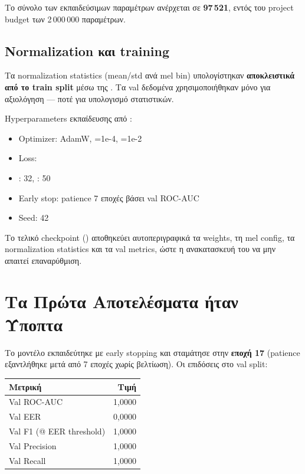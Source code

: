 Το σύνολο των εκπαιδεύσιμων παραμέτρων ανέρχεται σε \textbf{97\,521},
εντός του project budget των 2\,000\,000 παραμέτρων.

\subsection{Normalization και training}
\label{subsec:mel-training}

Τα normalization statistics (mean/std ανά mel bin) υπολογίστηκαν
\textbf{αποκλειστικά από το train split} μέσω της .
Τα val δεδομένα χρησιμοποιήθηκαν μόνο για αξιολόγηση — ποτέ για
υπολογισμό στατιστικών.

Hyperparameters εκπαίδευσης από :
\begin{itemize}
  \item Optimizer: AdamW, =1e-4, =1e-2
  \item Loss: 
  \item {}: 32, : 50
  \item Early stop: patience 7 εποχές βάσει val ROC-AUC
  \item Seed: 42
\end{itemize}

Το τελικό checkpoint ()
αποθηκεύει αυτοπεριγραφικά τα weights, τη mel config, τα normalization
statistics και τα val metrics, ώστε η ανακατασκευή του να μην απαιτεί
επαναρύθμιση.

\section{Τα Πρώτα Αποτελέσματα ήταν Ύποπτα}
\label{sec:results-suspicious}

Το μοντέλο εκπαιδεύτηκε με early stopping και σταμάτησε στην
\textbf{εποχή 17} (patience εξαντλήθηκε μετά από 7 εποχές χωρίς βελτίωση).
Οι επιδόσεις στο val split:

\begin{center}
\begin{tabular}{lr}
\hline
Μετρική & Τιμή \\
\hline
Val ROC-AUC & 1{,}0000 \\
Val EER & 0{,}0000 \\
Val F1 (@ EER threshold) & 1{,}0000 \\
Val Precision & 1{,}0000 \\
Val Recall & 1{,}0000 \\
\hline
\end{tabular}
\end{center}

